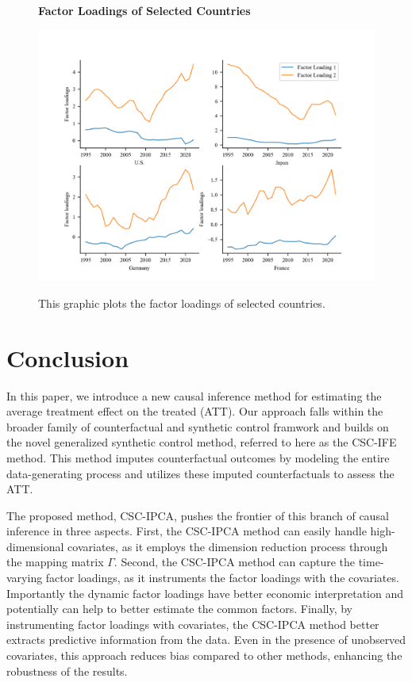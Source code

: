 \documentclass[12pt]{article}
\begin{document}
\begin{figure}[!ht]
    \centering
    \caption{\textbf{Factor Loadings of Selected Countries}} 
    \includegraphics{figs/loadings_ipca.png}
    \label{fig: loadings}
    \caption*{\footnotesize{This graphic plots the factor loadings of selected countries.}}
\end{figure}
\section{Conclusion} 
\label{sec: conclusion}
In this paper, we introduce a new causal inference method for estimating the average treatment effect on the treated (ATT). Our approach falls within the broader family of counterfactual and synthetic control framwork and builds on the novel generalized synthetic control method, referred to here as the CSC-IFE method. This method imputes counterfactual outcomes by modeling the entire data-generating process and utilizes these imputed counterfactuals to assess the ATT.

The proposed method, CSC-IPCA, pushes the frontier of this branch of causal inference in three aspects. First, the CSC-IPCA method can easily handle high-dimensional covariates, as it employs the dimension reduction process through the mapping matrix $\Gamma$. Second, the CSC-IPCA method can capture the time-varying factor loadings, as it instruments the factor loadings with the covariates. Importantly the dynamic factor loadings have better economic interpretation and potentially can help to better estimate the common factors. Finally, by instrumenting factor loadings with covariates, the CSC-IPCA method better extracts predictive information from the data. Even in the presence of unobserved covariates, this approach reduces bias compared to other methods, enhancing the robustness of the results.
\end{document}
